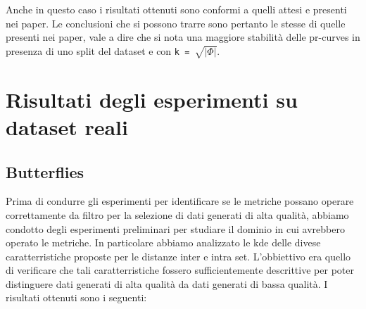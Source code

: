 Anche in questo caso i risultati ottenuti sono conformi a quelli attesi e presenti nei paper. Le conclusioni che si possono trarre sono pertanto le stesse di quelle presenti nei paper, vale a dire che si nota una maggiore stabilità delle pr-curves in presenza di uno split del dataset e con \texttt{k = \(\sqrt{|\Phi|}\)}.

\section{Risultati degli esperimenti su dataset reali}

\subsection{Butterflies}

Prima di condurre gli esperimenti per identificare se le metriche possano operare correttamente da filtro per la selezione di dati generati di alta qualità, abbiamo condotto degli esperimenti preliminari per studiare il dominio in cui avrebbero operato le metriche.
In particolare abbiamo analizzato le kde delle divese caratterristiche proposte per le distanze inter e intra set. L'obbiettivo era quello di verificare che tali caratterristiche fossero sufficientemente descrittive per poter distinguere dati generati di alta qualità da dati generati di bassa qualità.
I risultati ottenuti sono i seguenti:

